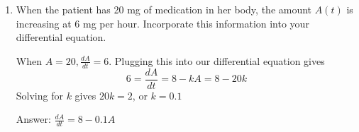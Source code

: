 \documentclass{article}
\begin{document}
\begin{enumerate}
\begin{enumerate}
\begin{problem}[\vfill]
  If $A(t)$ is the amount of medication in her body at time $t$, write a differential equation for $A$ that reflects this information. 
  
\end{problem}
    \begin{solution}
      We want to write a differential equation about $\frac{dA}{dt}$, the
      instantaneous rate of change (in mg/hour) of medication in the patient's body.
      There are two factors that cause the amount of medication in her
      body to change: the fact that she's taking medication and the fact that
      her body is metabolizing it.  We can put these together as
      \[ 
      \frac{dA}{dt} = \left(
        \begin{minipage}{2in}
          \centering rate of increase of medication due to the patient
          taking it
        \end{minipage} \right) - \left(
        \begin{minipage}{2in}
          \centering rate of decrease of medication due to metabolism
        \end{minipage} \right)\] 
      We are told that the rate at which she metabolizes medication is
      proportional to $A$, the amount in her body, so
      \[ \text{rate at which the patient metabolizes medication} = k A \] for some
      constant $k$.  This means that  $\boxed{
        \frac{dA}{dt} = 8 - k A}$.

    \end{solution}

 \item
    \begin{problem}[\vfill]
      When the patient has 20 mg of medication in her body, the amount $A(t)$ is increasing at 6 mg per hour. Incorporate this information into your differential equation. 
    \end{problem}
\begin{solution}
When $A = 20, \frac{dA}{dt} = 6$. Plugging this into our differential equation gives $$6 = \frac{dA}{dt} = 8 - k A = 8-20k$$
Solving for $k$ gives $20k = 2$, or $k = 0.1$

Answer: $\boxed{
        \frac{dA}{dt} = 8 - 0.1 A}$
\end{solution}
    

\end{enumerate}
\end{enumerate}
\end{document}
